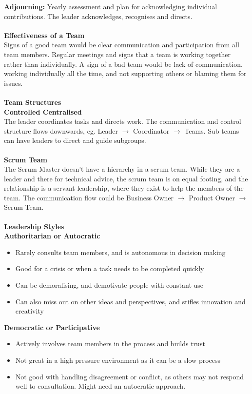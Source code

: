 \documentclass[a4paper,10pt]{article}
\begin{document}
\textbf{Adjourning:} Yearly assessment and plan for acknowledging individual contributions. The leader acknowledges, recognises and directs. \\\\
\textcolor{BlueGreen}{\textbf{Effectiveness of a Team}} \\
Signs of a good team would be clear communication and participation from all team members. Regular meetings and signs that a team is working together rather than individually. A sign of a bad team would be lack of communication, working individually all the time, and not supporting others or blaming them for issues. \\\\
\textcolor{BlueGreen}{\textbf{Team Structures}} \\ 
\textbf{Controlled Centralised} \\ 
The leader coordinates tasks and directs work. The communication and control structure flows downwards, eg. Leader $\rightarrow$ Coordinator $\rightarrow$ Teams. Sub teams can have leaders to direct and guide subgroups. \\\\
\textbf{Scrum Team} \\
The Scrum Master doesn't have a hierarchy in a scrum team. While they are a leader and there for technical advice, the scrum team is on equal footing, and the relationship is a servant leadership, where they exist to help the members of the team. The communication flow could be Business Owner $\rightarrow$ Product Owner $\rightarrow$ Scrum Team. \\\\
\newpage
\noindent \textcolor{BlueGreen}{\textbf{Leadership Styles}} \\ 
\textbf{Authoritarian or Autocratic} 
\begin{itemize}
	\item Rarely consults team members, and is autonomous in decision making 
	\item Good for a crisis or when a task needs to be completed quickly 
	\item Can be demoralising, and demotivate people with constant use 
	\item Can also miss out on other ideas and perspectives, and stifles innovation and creativity 
\end{itemize}
\textbf{Democratic or Participative}
\begin{itemize}
	\item Actively involves team members in the process and builds trust 
	\item Not great in a high pressure environment as it can be a slow process 
	\item Not good with handling disagreement or conflict, as others may not respond well to consultation. Might need an autocratic approach. 
\end{itemize}
\end{document}
